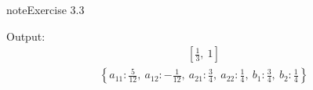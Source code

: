 \documentclass[letterpaper,10pt,english]{jupyterBook}
\begin{document}
\begin{sphinxadmonition}{note}{Exercise 3.3}
\begin{sphinxVerbatim}[commandchars=\\\{\}]
     
\end{sphinxVerbatim}

\sphinxAtStartPar
Output:
\begin{equation}\label{equation:intro:ex3.3-output-1}
\begin{split}\displaystyle \left[ \frac{1}{3}, \  1\right]\end{split}
\end{equation}\begin{equation}\label{equation:intro:ex3.3-output-2}
\begin{split}\displaystyle \left\{ a_{11} : \frac{5}{12}, \  a_{12} : - \frac{1}{12}, \  a_{21} : \frac{3}{4}, \  a_{22} : \frac{1}{4}, \  b_{1} : \frac{3}{4}, \  b_{2} : \frac{1}{4}\right\}\end{split}
\end{equation}\end{sphinxadmonition}
\end{document}
